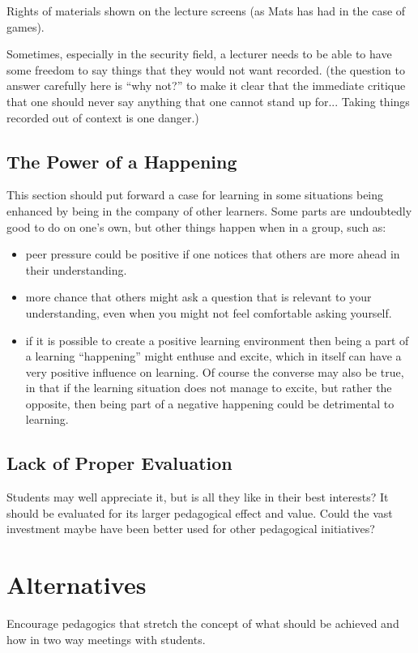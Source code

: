 \documentclass[a4paper,10pt]{article}
\begin{document}
Rights of materials shown on the lecture screens (as Mats has had in the case of games).

Sometimes, especially in the security field, a lecturer needs to be able to have some freedom to say things that they would not want recorded. (the question to answer carefully here is 
``why not?''
 to make it clear that the immediate critique that one should never say anything that one cannot stand up for... Taking things recorded out of context is one danger.) 

\subsection{The Power of a Happening}
This section should put forward a case for learning in some situations being enhanced by being in the company of other learners. Some parts are undoubtedly good to do on one's own, but other things happen when in a group, such as:
\begin{itemize}
\item  peer pressure could be positive if one notices that others are more ahead in their understanding. 
\item more chance that others might ask a question that is relevant to your understanding, even when you might not feel comfortable asking yourself.
\item if it is possible to create a positive learning environment then being a part of a learning ``happening'' might enthuse and excite, which in itself can have a very positive influence on learning. Of course the converse may also be true, in that if the learning situation does not manage to excite, but rather the opposite, then being part of a negative happening could be detrimental to learning.
\end{itemize}



\subsection{Lack of Proper Evaluation}
Students may well appreciate it, but is all they like in their best interests? It should be evaluated for its larger pedagogical effect and value.
Could the vast investment maybe have been better used for other pedagogical initiatives?

\section{Alternatives}
Encourage pedagogics that stretch the concept of what should be achieved and how in two way meetings with students.
\end{document}

